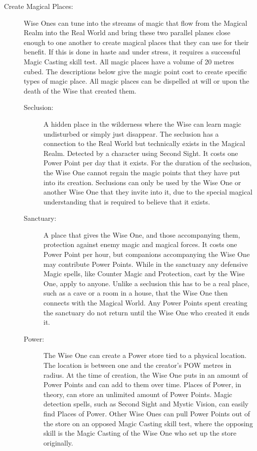 \begin{description}
\item[Create Magical Places:] Wise Ones can tune into the streams of magic that flow from the Magical Realm into the Real World and bring these two parallel planes close enough to one another to create magical places that they can use for their benefit. If this is done in haste and under stress, it requires a successful Magic Casting skill test. All magic places have a volume of 20 metres cubed. The descriptions below give the magic point cost to create specific types of magic place. All magic places can be dispelled at will or upon the death of the Wise that created them.
\begin{description}
\item[Seclusion:] A hidden place in the wilderness where the Wise can learn magic undisturbed or simply just disappear. The seclusion has a connection to the Real World but technically exists in the Magical Realm. Detected by a character using Second Sight. It costs one Power Point per day that it exists. For the duration of the seclusion, the Wise One cannot regain the magic points that they have put into its creation.  Seclusions can only be used by the Wise One or another Wise One that they invite into it, due to the special magical understanding that is required to believe that it exists.
\item[Sanctuary:] A place that gives the Wise One, and those accompanying them, protection against enemy magic and magical forces. It costs one Power Point per hour, but companions accompanying the Wise One may contribute Power Points. While in the sanctuary any defensive Magic spells, like Counter Magic and Protection, cast by the Wise One, apply to anyone. Unlike a seclusion this has to be a real place, such as a cave or a room in a house, that the Wise One then connects with the Magical World. Any Power Points spent creating the sanctuary do not return until the Wise One who created it ends it.
\item[Power:] The Wise One can create a Power store tied to a physical location. The location is between one and the creator’s POW metres in radius. At the time of creation, the Wise One puts in an amount of Power Points and can add to them over time. Places of Power, in theory, can store an unlimited amount of Power Points. Magic detection spells, such as Second Sight and Mystic Vision, can easily find Places of Power. Other Wise Ones can pull Power Points out of the store on an opposed Magic Casting skill test, where the opposing skill is the Magic Casting of the Wise One who set up the store originally.
\end{description}
\end{description}


